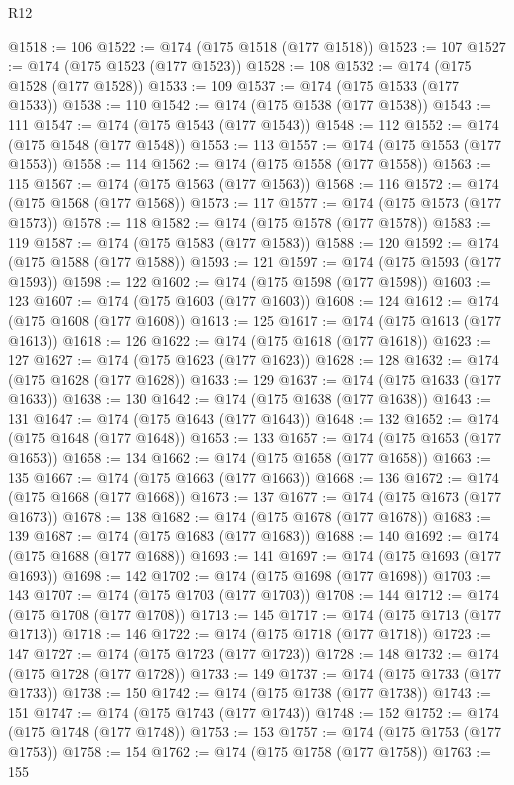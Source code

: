 \begin{lexlean}{R12}
\begin{coremodule}
{{{{{{{{{{{{{{{{{{{{{{{{{{{{{{{{{{{{{{{{{{{{{{{{{{{{{{{{{{{{{{{{{{{{{{{{{{{{{{{{{{{{{{{{{{{{{{{{{{{{{{{{{{@1518 := 106
@1522 := @174 (@175 @1518 (@177 @1518))
@1523 := 107
@1527 := @174 (@175 @1523 (@177 @1523))
@1528 := 108
@1532 := @174 (@175 @1528 (@177 @1528))
@1533 := 109
@1537 := @174 (@175 @1533 (@177 @1533))
@1538 := 110
@1542 := @174 (@175 @1538 (@177 @1538))
@1543 := 111
@1547 := @174 (@175 @1543 (@177 @1543))
@1548 := 112
@1552 := @174 (@175 @1548 (@177 @1548))
@1553 := 113
@1557 := @174 (@175 @1553 (@177 @1553))
@1558 := 114
@1562 := @174 (@175 @1558 (@177 @1558))
@1563 := 115
@1567 := @174 (@175 @1563 (@177 @1563))
@1568 := 116
@1572 := @174 (@175 @1568 (@177 @1568))
@1573 := 117
@1577 := @174 (@175 @1573 (@177 @1573))
@1578 := 118
@1582 := @174 (@175 @1578 (@177 @1578))
@1583 := 119
@1587 := @174 (@175 @1583 (@177 @1583))
@1588 := 120
@1592 := @174 (@175 @1588 (@177 @1588))
@1593 := 121
@1597 := @174 (@175 @1593 (@177 @1593))
@1598 := 122
@1602 := @174 (@175 @1598 (@177 @1598))
@1603 := 123
@1607 := @174 (@175 @1603 (@177 @1603))
@1608 := 124
@1612 := @174 (@175 @1608 (@177 @1608))
@1613 := 125
@1617 := @174 (@175 @1613 (@177 @1613))
@1618 := 126
@1622 := @174 (@175 @1618 (@177 @1618))
@1623 := 127
@1627 := @174 (@175 @1623 (@177 @1623))
@1628 := 128
@1632 := @174 (@175 @1628 (@177 @1628))
@1633 := 129
@1637 := @174 (@175 @1633 (@177 @1633))
@1638 := 130
@1642 := @174 (@175 @1638 (@177 @1638))
@1643 := 131
@1647 := @174 (@175 @1643 (@177 @1643))
@1648 := 132
@1652 := @174 (@175 @1648 (@177 @1648))
@1653 := 133
@1657 := @174 (@175 @1653 (@177 @1653))
@1658 := 134
@1662 := @174 (@175 @1658 (@177 @1658))
@1663 := 135
@1667 := @174 (@175 @1663 (@177 @1663))
@1668 := 136
@1672 := @174 (@175 @1668 (@177 @1668))
@1673 := 137
@1677 := @174 (@175 @1673 (@177 @1673))
@1678 := 138
@1682 := @174 (@175 @1678 (@177 @1678))
@1683 := 139
@1687 := @174 (@175 @1683 (@177 @1683))
@1688 := 140
@1692 := @174 (@175 @1688 (@177 @1688))
@1693 := 141
@1697 := @174 (@175 @1693 (@177 @1693))
@1698 := 142
@1702 := @174 (@175 @1698 (@177 @1698))
@1703 := 143
@1707 := @174 (@175 @1703 (@177 @1703))
@1708 := 144
@1712 := @174 (@175 @1708 (@177 @1708))
@1713 := 145
@1717 := @174 (@175 @1713 (@177 @1713))
@1718 := 146
@1722 := @174 (@175 @1718 (@177 @1718))
@1723 := 147
@1727 := @174 (@175 @1723 (@177 @1723))
@1728 := 148
@1732 := @174 (@175 @1728 (@177 @1728))
@1733 := 149
@1737 := @174 (@175 @1733 (@177 @1733))
@1738 := 150
@1742 := @174 (@175 @1738 (@177 @1738))
@1743 := 151
@1747 := @174 (@175 @1743 (@177 @1743))
@1748 := 152
@1752 := @174 (@175 @1748 (@177 @1748))
@1753 := 153
@1757 := @174 (@175 @1753 (@177 @1753))
@1758 := 154
@1762 := @174 (@175 @1758 (@177 @1758))
@1763 := 155
}}}}}}}}}}}}}}}}}}}}}}}}}}}}}}}}}}}}}}}}}}}}}}}}}}}}}}}}}}}}}}}}}}}}}}}}}}}}}}}}}}}}}}}}}}}}}}}}}}}}}}}}}}
\end{coremodule}
\end{lexlean}
